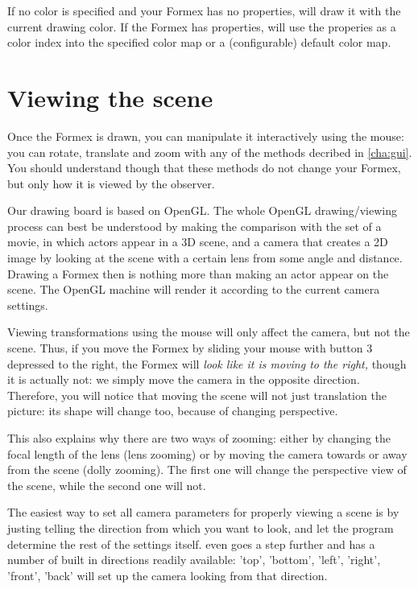If no color is specified and your Formex has no properties, \pyformex will draw it with the current drawing color. If the Formex has properties, \pyformex will use the properies as a color index into the specified color map or a (configurable) default color map.



 
\section{Viewing the scene}
Once the Formex is drawn, you can manipulate it interactively using the mouse: you can rotate, translate and zoom with any of the methods decribed in \ref{cha:gui}. You should understand though that these methods do not change your Formex, but only how it is viewed by the observer. 

Our drawing board is based on OpenGL. The whole OpenGL drawing/viewing process can best be understood by making the comparison with the set of a movie, in which actors appear in a 3D scene, and a camera that creates a 2D image by looking at the scene with a certain lens from some angle and distance. Drawing a Formex then is nothing more than making an actor appear on the scene. The OpenGL machine will render it according to the current camera settings. 

Viewing transformations using the mouse will only affect the camera, but not the scene. Thus, if you move the Formex by sliding your mouse with button 3 depressed to the right, the Formex will \emph{look like it is moving to the right,} though it is actually not: we simply move the camera in the opposite direction. Therefore, you will notice that moving the scene will not just translation the picture: its shape will change too, because of changing perspective.

This also explains why there are two ways of zooming: either by changing the focal length of the lens (lens zooming) or by moving the camera towards or away from the scene (dolly zooming). The first one will change the perspective view of the scene, while the second one will not. 

The easiest way to set all camera parameters for properly viewing a scene is by justing telling the direction from which you want to look, and let the program determine the rest of the settings itself. \pyformex even goes a step further and has a number of built in directions readily available: 'top', 'bottom', 'left', 'right', 'front', 'back' will set up the camera looking from that direction.

